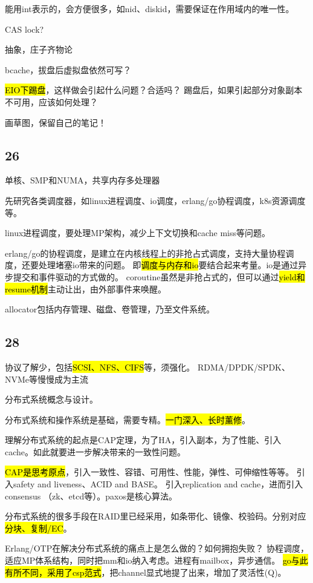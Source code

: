 \hrulefill

能用int表示的，会方便很多，如nid、diskid，需要保证在作用域内的唯一性。

CAS lock?

抽象，庄子齐物论

\hrulefill

bcache，拔盘后虚拟盘依然可写？

\hl{EIO下踢盘}，这样做会引起什么问题？合适吗？
踢盘后，如果引起部分对象副本不可用，应该如何处理？

画草图，保留自己的笔记！

\subsection{26}

单核、SMP和NUMA，共享内存多处理器

先研究各类调度器，如linux进程调度、io调度，erlang/go协程调度，k8s资源调度等。

linux进程调度，要处理MP架构，减少上下文切换和cache miss等问题。

erlang/go的协程调度，是建立在内核线程上的非抢占式调度，支持大量协程调度，还要处理堵塞io带来的问题。
即\hl{调度与内存和io}要结合起来考量。io是通过异步提交和事件驱动的方式做的。
coroutine虽然是非抢占式的，但可以通过\hl{yield和resume机制}主动让出，由外部事件来唤醒。

allocator包括内存管理、磁盘、卷管理，乃至文件系统。

\subsection{28}

协议了解少，包括\hl{SCSI、NFS、CIFS}等，须强化。
RDMA/DPDK/SPDK、NVMe等慢慢成为主流

\hrulefill

分布式系统概念与设计。

分布式系统和操作系统是基础，需要专精。\hl{一门深入、长时薰修}。

理解分布式系统的起点是CAP定理，为了HA，引入副本，为了性能、引入cache。如此就要进一步解决带来的一致性问题。

\hl{CAP是思考原点}，引入一致性、容错、可用性、性能，弹性、可伸缩性等等。
引入safety and liveness、ACID and BASE。
引入replication and cache，进而引入consensus （zk、etcd等）。paxos是核心算法。

分布式系统的很多手段在RAID里已经采用，如条带化、镜像、校验码。分别对应\hl{分块、复制/EC}。

Erlang/OTP在解决分布式系统的痛点上是怎么做的？如何拥抱失败？
协程调度，适应MP体系结构，同时把mm和io纳入考虑。进程有mailbox，异步通信。
\hl{go与此有所不同，采用了csp范式}，把channel显式地提了出来，增加了灵活性(Q)。

